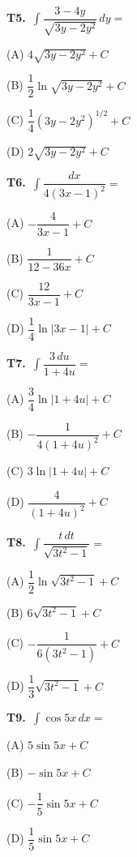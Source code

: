 \documentclass[11pt]{article}
\begin{document}
\bigskip\noindent\textbf{T5.}\ $\displaystyle\int \dfrac{3-4y}{\sqrt{3y-2y^2}}\,dy =$
\begin{list}{}{\setlength{\leftmargin}{3em}\setlength{\labelwidth}{2.5em}\setlength{\itemsep}{0pt}\setlength{\topsep}{2pt}}
\item[(A)] $4\sqrt{3y-2y^2}+C$
\item[(B)] $\dfrac{1}{2}\ln\sqrt{3y-2y^2}+C$
\item[(C)] $\dfrac{1}{4}(3y-2y^2)^{1/2}+C$
\item[(D)] $2\sqrt{3y-2y^2}+C$
\end{list}

\bigskip\noindent\textbf{T6.}\ $\displaystyle\int \dfrac{dx}{4(3x-1)^2} =$
\begin{list}{}{\setlength{\leftmargin}{3em}\setlength{\labelwidth}{2.5em}\setlength{\itemsep}{0pt}\setlength{\topsep}{2pt}}
\item[(A)] $-\dfrac{4}{3x-1}+C$
\item[(B)] $\dfrac{1}{12-36x}+C$
\item[(C)] $\dfrac{12}{3x-1}+C$
\item[(D)] $\dfrac{1}{4}\ln|3x-1|+C$
\end{list}

\bigskip\noindent\textbf{T7.}\ $\displaystyle\int \dfrac{3\,du}{1+4u} =$
\begin{list}{}{\setlength{\leftmargin}{3em}\setlength{\labelwidth}{2.5em}\setlength{\itemsep}{0pt}\setlength{\topsep}{2pt}}
\item[(A)] $\dfrac{3}{4}\ln|1+4u|+C$
\item[(B)] $-\dfrac{1}{4(1+4u)^2}+C$
\item[(C)] $3\ln|1+4u|+C$
\item[(D)] $\dfrac{4}{(1+4u)^2}+C$
\end{list}

\bigskip\noindent\textbf{T8.}\ $\displaystyle\int \dfrac{t\,dt}{\sqrt{3t^2-1}} =$
\begin{list}{}{\setlength{\leftmargin}{3em}\setlength{\labelwidth}{2.5em}\setlength{\itemsep}{0pt}\setlength{\topsep}{2pt}}
\item[(A)] $\dfrac{1}{2}\ln\sqrt{3t^2-1}+C$
\item[(B)] $6\sqrt{3t^2-1}+C$
\item[(C)] $-\dfrac{1}{6(3t^2-1)}+C$
\item[(D)] $\dfrac{1}{3}\sqrt{3t^2-1}+C$
\end{list}

\bigskip\noindent\textbf{T9.}\ $\displaystyle\int \cos 5x\,dx =$
\begin{list}{}{\setlength{\leftmargin}{3em}\setlength{\labelwidth}{2.5em}\setlength{\itemsep}{0pt}\setlength{\topsep}{2pt}}
\item[(A)] $5\sin 5x+C$
\item[(B)] $-\sin 5x+C$
\item[(C)] $-\dfrac{1}{5}\sin 5x+C$
\item[(D)] $\dfrac{1}{5}\sin 5x+C$
\end{list}
\end{document}
